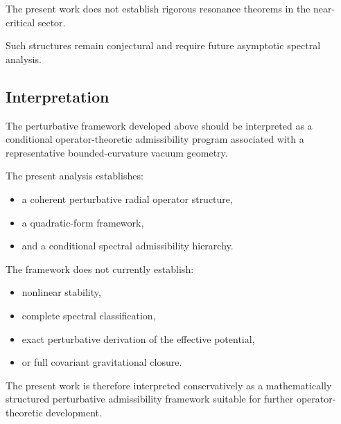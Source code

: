 The present work does not establish rigorous resonance theorems in the near-critical sector.

Such structures remain conjectural and require future asymptotic spectral analysis.


\subsection{Interpretation}

The perturbative framework developed above should be interpreted as a conditional operator-theoretic admissibility program associated with a representative bounded-curvature vacuum geometry.

The present analysis establishes:
\begin{itemize}[leftmargin=0.6cm]
\item a coherent perturbative radial operator structure,
\item a quadratic-form framework,
\item and a conditional spectral admissibility hierarchy.
\end{itemize}

The framework does not currently establish:
\begin{itemize}[leftmargin=0.6cm]
\item nonlinear stability,
\item complete spectral classification,
\item exact perturbative derivation of the effective potential,
\item or full covariant gravitational closure.
\end{itemize}

The present work is therefore interpreted conservatively as a mathematically structured perturbative admissibility framework suitable for further operator-theoretic development.
